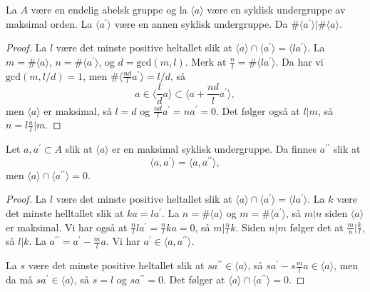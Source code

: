 \begin{lemma}\label{thm:cycles-divide-maximal}
    La $A$ være en endelig abelsk gruppe og la $\langle a\rangle$
    være en syklisk undergruppe av maksimal orden.
    La $\langle a^\prime\rangle$ være en annen syklisk undergruppe.
    Da $\#\langle a^\prime\rangle | \#\langle a\rangle$.
\end{lemma}
\begin{proof}
    La $l$ være det minste positive heltallet slik at
    $\langle a\rangle \cap \langle a^\prime \rangle = \langle la^\prime\rangle$.
    La $m = \#\langle a\rangle$, $n = \#\langle a^\prime\rangle$,
    og $d = \mathrm{gcd}(m, l)$.
    Merk at $\frac n l = \#\langle la^\prime\rangle$.
    Da har vi $\mathrm{gcd}(m, l / d) = 1$,
    men $\#\langle \frac {nd} l a^\prime\rangle = l / d$,
    så
    \[
        a\in \langle \frac l d a\rangle
        \subset \langle a + \frac {nd} l a^\prime\rangle,
    \]
    men $\langle a\rangle$ er maksimal,
    så $l = d$ og $\frac {nd} l a^\prime = na^\prime = 0$.
    Det følger også at $l | m$, så $n = l\frac n l | m$.
\end{proof}

\begin{corollary}
    Let $a, a^\prime\subset A$ slik at $\langle a\rangle$
    er en maksimal syklisk undergruppe.
    Da finnes $a^{\prime\prime}$ slik at
    \[
        \langle a, a^\prime\rangle
        = \langle a, a^{\prime\prime}\rangle,
    \]
    men $\langle a\rangle \cap \langle a^{\prime\prime}\rangle = 0$.
\end{corollary}
\begin{proof}
    La $l$ være det minste positive heltallet slik at
    $\langle a\rangle \cap \langle a^\prime\rangle = \langle la^\prime\rangle$.
    La $k$ være det minste helltallet slik at $ka = la^\prime$.
    La $n = \# \langle a\rangle$ og $m = \#\langle a^\prime\rangle$,
    så $m | n$ siden $\langle a\rangle$ er maksimal.
    Vi har også at $\frac n l la^\prime = \frac n l ka = 0$,
    så $m | \frac n l k$.
    Siden $n | m$ følger det at $\frac m n | \frac k l$, så $l | k$.
    La $a^{\prime\prime} = a^\prime - \frac m l a$.
    Vi har $a^\prime \in \langle a, a^{\prime\prime}\rangle$.

    La $s$ være det minste positive heltallet slik at
    $sa^{\prime\prime}\in \langle a\rangle$,
    så $sa^\prime - s\frac m l a\in \langle a \rangle$,
    men da må $sa^\prime\in\langle a\rangle$,
    så $s = l$ og $sa^{\prime\prime} = 0$.
    Det følger at $\langle a\rangle \cap \langle a^{\prime\prime}\rangle = 0$.
\end{proof}

